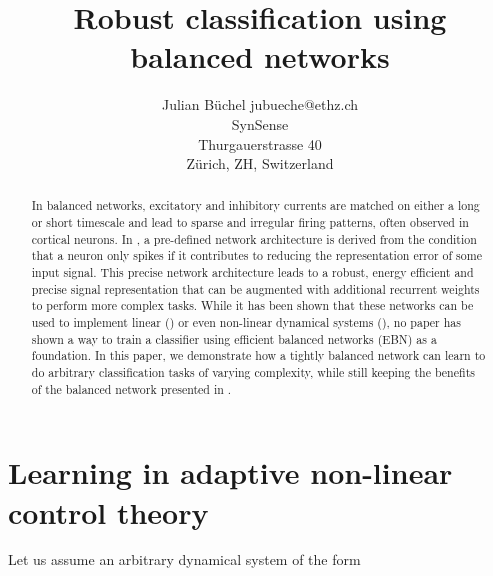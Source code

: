 \documentclass[twoside,11pt,titlepage]{article}
\begin{document}
\title{Robust classification using balanced networks}

\author{\name Julian B\"uchel \email jubueche@ethz.ch \\
       \addr SynSense\\
       Thurgauerstrasse 40 \\
       Z\"urich, ZH, Switzerland}


\maketitle

\newpage
\phantom{.}
\newpage

\tableofcontents
\newpage

\begin{abstract}%
  In balanced networks, excitatory and inhibitory currents are matched on either a long or short timescale and
  lead to sparse and irregular firing patterns, often observed in cortical neurons. In \cite{Bourdoukan:2012:LOS:2999325.2999390},
  a pre-defined network architecture is derived from the condition that a neuron only spikes if it contributes to reducing the
  representation error of some input signal. This precise network architecture leads to a robust, energy efficient and precise signal
  representation that can be augmented with additional recurrent weights to perform more complex tasks. \newline
  While it has been shown that these networks can be used to implement linear (\cite{boerlin}) or even non-linear dynamical systems (\cite{alemi2017learning}),
  no paper has shown a way to train a classifier using efficient balanced networks (EBN) as a foundation. \newline
  In this paper, we demonstrate how a tightly balanced network can learn to do arbitrary classification tasks of varying complexity, while still keeping 
  the benefits of the balanced network presented in \cite{Bourdoukan:2012:LOS:2999325.2999390}.
   
\end{abstract}

\newpage

\section{Learning in adaptive non-linear control theory} \label{sec:learning_adap}
Let us assume an arbitrary dynamical system of the form
\end{document}
